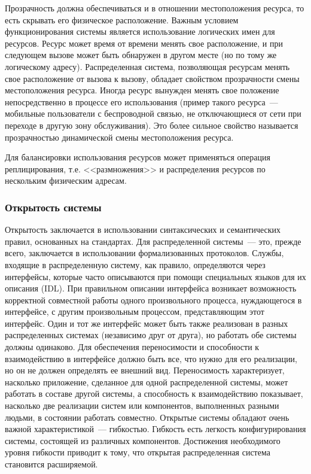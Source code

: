 Прозрачность должна обеспечиваться и в отношении местоположения ресурса, то есть скрывать его физическое расположение. Важным условием функционирования системы является использование логических имен для ресурсов. Ресурс может время от времени менять свое расположение, и при следующем вызове может быть обнаружен в другом месте (но по тому же логическому адресу). Распределенная система, позволяющая ресурсам менять свое расположение от вызова к вызову, обладает свойством прозрачности смены местоположения ресурса. Иногда ресурс вынужден менять свое положение непосредственно в процессе его использования (пример такого ресурса~--- мобильные пользователи с беспроводной связью, не отключающиеся от сети при переходе в другую зону обслуживания). Это более сильное свойство называется прозрачностью динамической смены местоположения ресурса.

Для балансировки использования ресурсов может применяться операция реплицирования, т.е. <<размножения>> и распределения ресурсов по нескольким физическим адресам.
\subsubsection{Открытость системы}
Открытость заключается в использовании синтаксических и семантических правил, основанных на стандартах. Для распределенной системы~--- это, прежде всего, заключается в использовании формализованных протоколов. Службы, входящие в распределенную систему, как правило, определяются через интерфейсы, которые часто описываются при помощи специальных языков для их описания (IDL). При правильном описании интерфейса возникает возможность корректной совместной работы одного произвольного процесса, нуждающегося в интерфейсе, с другим произвольным процессом, представляющим этот интерфейс. Один и тот же интерфейс может быть также реализован в разных распределенных системах (независимо друг от друга), но работать обе системы должны одинаково. Для обеспечения переносимости и способности к взаимодействию в интерфейсе должно быть все, что нужно для его реализации, но он не должен определять ее внешний вид. Переносимость характеризует, насколько приложение, сделанное для одной распределенной системы, может работать в составе другой системы, а способность к взаимодействию показывает, насколько две реализации систем или компонентов, выполненных разными людьми, в состоянии работать совместно. Открытые системы обладают очень важной характеристикой~--- гибкостью. Гибкость есть легкость конфигурирования системы, состоящей из различных компонентов. Достижения необходимого уровня гибкости приводит к тому, что открытая распределенная система становится расширяемой.

